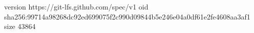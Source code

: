 version https://git-lfs.github.com/spec/v1
oid sha256:99714a98268dc92ed699075f2c990d09844b5e246e04a0df61e2fe4608aa3af1
size 43864
